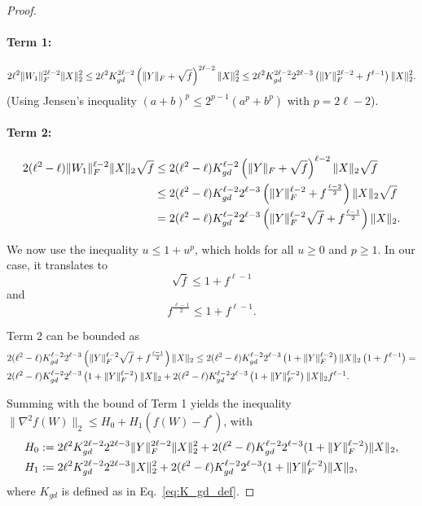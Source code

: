 \documentclass[10pt,a4paper]{amsart}
\DeclarePairedDelimiter{\norm}{\|}{\|}
\begin{document}
\begin{proof}
\paragraph{Term 1:}
\begin{align*}
2\ell^2 \norm{W_1}_F^{2\ell-2} \norm{X}_2^2
\le 2\ell^2 K_{gd}^{2\ell-2} \left( \norm{Y}_F + \sqrt{f} \right)^{2\ell-2} \norm{X}_2^2 
\le 2\ell^2 K_{gd}^{2\ell-2} 2^{2\ell-3} \left( \norm{Y}_F^{2\ell-2} + f^{\ell-1} \right) \norm{X}_2^2.
\end{align*}
(Using Jensen's inequality $(a+b)^p \le 2^{p-1}(a^p+b^p)$ with $p=2\ell-2$).

\paragraph{Term 2:}
\begin{align*}
2(\ell^2-\ell) \norm{W_1}_F^{\ell-2} \norm{X}_2 \sqrt{f}
&\le 2(\ell^2-\ell) K_{gd}^{\ell-2} \left( \norm{Y}_F + \sqrt{f} \right)^{\ell-2} \norm{X}_2 \sqrt{f} \\
&\le 2(\ell^2-\ell) K_{gd}^{\ell-2} 2^{\ell-3} \left( \norm{Y}_F^{\ell-2} + f^{\frac{\ell-2}{2}} \right) \norm{X}_2 \sqrt{f} \\
&= 2(\ell^2-\ell) K_{gd}^{\ell-2} 2^{\ell-3} \left( \norm{Y}_F^{\ell-2}\sqrt{f} + f^{\frac{\ell-1}{2}} \right) \norm{X}_2.
\end{align*}


We now use the inequality $u \leq 1+ u^p$, which holds for all $u \geq 0$ and $p \geq 1$. In our case, it translates to 
\begin{equation*}
    \sqrt{f} \leq 1+f^{\ell-1}
\end{equation*}
and
\begin{equation*}
    f^{\frac{\ell-1}{2}} \leq 1 + f^{\ell-1}.
\end{equation*}

Term 2 can be bounded as
\begin{align*}
    & 2(\ell^2-\ell) K_{gd}^{\ell-2} 2^{\ell-3} \left( \norm{Y}_F^{\ell-2}\sqrt{f} + f^{\frac{\ell-1}{2}} \right) \norm{X}_2 \leq 2(\ell^2-\ell) K_{gd}^{\ell-2} 2^{\ell-3} \left(1+\|Y\|_F^{\ell-2} \right) \|X\|_2 \left(1 + f^{\ell-1} \right) = \\ & 2(\ell^2-\ell) K_{gd}^{\ell-2} 2^{\ell-3} \left(1+\|Y\|_F^{\ell-2} \right) \|X\|_2 + 2(\ell^2-\ell) K_{gd}^{\ell-2} 2^{\ell-3} \left(1+\|Y\|_F^{\ell-2} \right) \|X\|_2 f^{\ell-1}.
\end{align*}

Summing with the bound of Term 1 yields the inequality $\|\nabla^2 f(W)\|_2 \leq H_0 + H_1 (f(W)-f^*)$, with
\begin{align}
\label{eq:H01-post-final}
H_0 &:= 2\ell^2 K_{gd}^{2\ell-2} 2^{2\ell-3} \norm{Y}_F^{2\ell-2} \norm{X}_2^2 + 2(\ell^2-\ell) K_{gd}^{\ell-2} 2^{\ell-3} (1+ \norm{Y}_F^{\ell-2}) \norm{X}_2, \nonumber \\
H_1 &:= 2\ell^2 K_{gd}^{2\ell-2} 2^{2\ell-3} \norm{X}_2^2 + 2(\ell^2-\ell) K_{gd}^{\ell-2} 2^{\ell-3} (1+ \|Y\|_F^{\ell-2}) \norm{X}_2,
\end{align}
where $K_{gd}$ is defined as in Eq.~\eqref{eq:K_gd_def}.




    
\end{proof}
\end{document}
